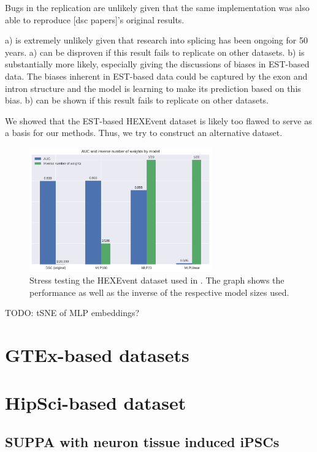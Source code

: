 Bugs in the replication  are unlikely given that the same implementation was also able to reproduce [dsc papers]'s original results.


a) is extremely unlikely given that research into splicing has been ongoing for 50 years. a) can be disproven if this result fails to replicate on other datasets.
b) is substantially more likely, especially giving the discussions of biases in EST-based data. The biases inherent in EST-based data could be captured by the exon and intron structure and the model is learning to make its prediction based on this bias. b) can be shown if this result fails to replicate on other datasets. 


We showed that the EST-based HEXEvent dataset is likely too flawed to serve as a basis for our methods. Thus, we try to construct an alternative dataset.



\begin{figure}
	\centering\includegraphics[width=0.7\textwidth]{../visualizations/dsc_funeral_barchart.png} 
	\caption[bla.]{Stress testing the HEXEvent dataset used in \cite{dsc}. The graph shows the performance as well as the inverse of the respective model sizes used.}
	\label{fig:dsc_funeral}
\end{figure}

TODO: tSNE of MLP embeddings?


\section{GTEx-based datasets} \label{sec:gtex}

\section{HipSci-based dataset} \label{sec:hipsci} 
\subsection{SUPPA with neuron tissue induced iPSCs} \label{subsec:hipsci_suppa}

